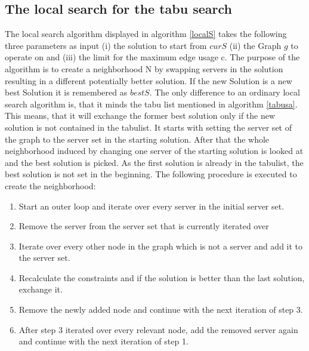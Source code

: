 \documentclass [12pt]{article}
\begin{document}
\subsection{The local search for the tabu search}
The local search algorithm displayed in algorithm \ref{localS} takes
the following three parameters as input (i) the solution to start from $curS$
(ii) the Graph $g$ to operate on and (iii) the limit for the maximum edge usage c.
The purpose of the algorithm is to create a neighborhood N by swapping servers in the solution
resulting in a different potentially better solution. If the new Solution is a new best Solution it is remembered as $bestS$.
The only difference to an ordinary local search algorithm is, that it minds the tabu list mentioned in algorithm \ref{tabusa}.
This means, that it will exchange the former best solution only if the new solution is not contained in the tabulist.
It starts with setting the server set of the graph to the server set in the starting solution. After that the whole
neighborhood induced by changing one server of the starting solution is looked at and the best solution is picked. As the first solution
is already in the tabulist, the best solution is not set in the beginning.
The following procedure is executed to create the neighborhood:
\begin{enumerate}
  \item{Start an outer loop and iterate over every server in the initial server set.}
  \item{Remove the server from the server set that is currently iterated over}
  \item{Iterate over every other node in the graph which is not a server and add it to the server set.}
  \item{Recalculate the constraints and if the solution is better than the last solution, exchange it.}
  \item{Remove the newly added node and continue with the next iteration of step 3.}
  \item{After step 3 iterated over every relevant node, add the removed server again and continue with the next iteration of step 1.}
\end{enumerate}
\end{document}
